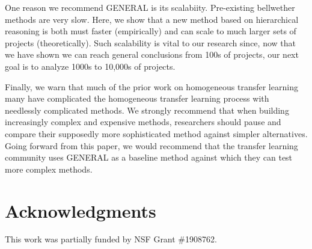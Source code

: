 \documentclass[10pt,journal,compsoc]{IEEEtran}
\begin{document}
One reason we recommend GENERAL is its scalabiity.
Pre-existing
bellwether methods are very slow. Here, we show
that a new method based on hierarchical reasoning
is both must faster (empirically) and can scale to much
larger sets of projects (theoretically). Such scalability
is vital to our research since, now that we have shown
we can reach general conclusions from 100s of projects,
our next goal is to analyze 1000s to 10,000s of projects.



Finally, we warn that much of the prior work on homogeneous transfer learning many  have complicated the homogeneous transfer learning process with needlessly
complicated methods.
  We strongly recommend that when building increasingly complex and expensive  methods, researchers should pause and compare their supposedly more sophisticated method against simpler alternatives. Going forward from this paper, we would recommend that the transfer learning community uses GENERAL as a baseline method against which they can test more complex methods.




\section{Acknowledgments}
\label{sec:ack}

This work was partially funded by NSF Grant \#1908762.
 

 
 
\end{document}
